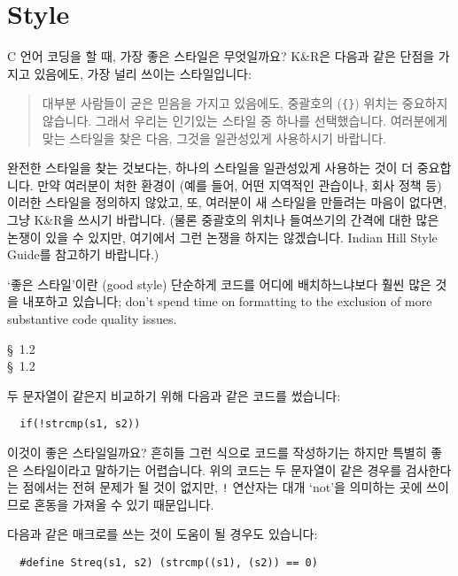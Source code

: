 \chapter{Style}	\label{chap:style}

\begin{faq}
	C 언어 코딩을 할 때, 가장 좋은 스타일은 무엇일까요?
\A
	K\&R은 다음과 같은 단점을 가지고 있음에도, 가장 널리 쓰이는
	스타일입니다:
\begin{quote}
	대부분 사람들이 굳은 믿음을 가지고 있음에도, 중괄호의 (\verb+{}+)
	위치는 중요하지 않습니다.  그래서 우리는 인기있는 스타일 중
	하나를 선택했습니다.  여러분에게 맞는 스타일을 찾은 다음,
	그것을 일관성있게 사용하시기 바랍니다.
\end{quote}

	완전한 스타일을 찾는 것보다는, 하나의 스타일을 일관성있게
	사용하는 것이 더 중요합니다.  만약 여러분이 처한 환경이 (예를 들어,
	어떤 지역적인 관습이나, 회사 정책 등) 이러한 스타일을 정의하지
	않았고, 또, 여러분이 새 스타일을 만들려는 마음이 없다면,
	그냥 K\&R을 쓰시기 바랍니다.  (물론 중괄호의 위치나 들여쓰기의
	간격에 대한 많은 논쟁이 있을 수 있지만, 여기에서 그런 논쟁을
	하지는 않겠습니다.  Indian Hill Style Guide를 참고하기 바랍니다.)

	`좋은 스타일'이란 (good style) 단순하게 코드를 어디에 배치하느냐보다
	훨씬 많은 것을 내포하고 있습니다; don't spend time on formatting to the
	exclusion of more substantive code quality issues.

\R
	\cite{kr1} \S\ 1.2  \\
	\cite{kr2} \S\ 1.2 
\end{faq}

\begin{faq}
	두 문자열이 같은지 비교하기 위해 다음과 같은 코드를 썼습니다:
\begin{verbatim}
  if(!strcmp(s1, s2))
\end{verbatim}
	\noindent 이것이 좋은 스타일일까요?
\A
	흔히들 그런 식으로 코드를 작성하기는 하지만 특별히 좋은 스타일이라고
	말하기는 어렵습니다.  위의 코드는 두 문자열이 같은 경우를 검사한다는
	점에서는 전혀 문제가 될 것이 없지만, \verb+!+ 연산자는
	대개 `not'을 의미하는 곳에 쓰이므로 혼동을 가져올 수 있기 때문입니다.

	다음과 같은 매크로를 쓰는 것이 도움이 될 경우도 있습니다:
\begin{verbatim}
  #define Streq(s1, s2) (strcmp((s1), (s2)) == 0)
\end{verbatim}

\end{faq}

